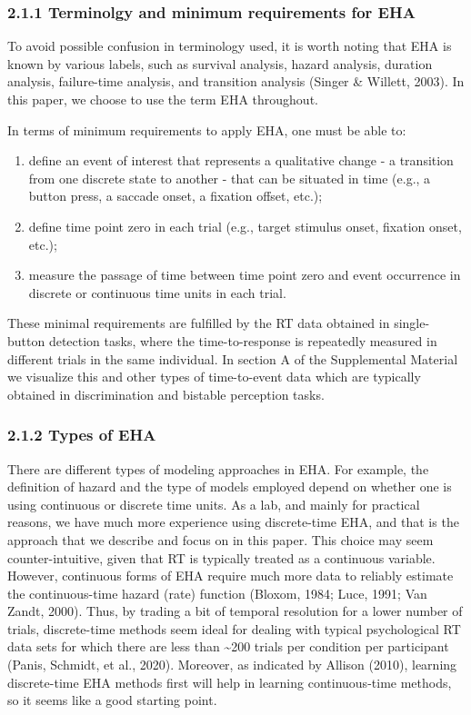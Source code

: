 \documentclass[
  man, donotrepeattitle,floatsintext]{apa6}
\begin{document}
\subsubsection{2.1.1 Terminolgy and minimum requirements for EHA}\label{terminolgy-and-minimum-requirements-for-eha}

To avoid possible confusion in terminology used, it is worth noting that EHA is known by various labels, such as survival analysis, hazard analysis, duration analysis, failure-time analysis, and transition analysis (Singer \& Willett, 2003). In this paper, we choose to use the term EHA throughout.

In terms of minimum requirements to apply EHA, one must be able to:

\begin{enumerate}
\def\labelenumi{\arabic{enumi}.}
\item
  define an event of interest that represents a qualitative change - a transition from one discrete state to another - that can be situated in time (e.g., a button press, a saccade onset, a fixation offset, etc.);
\item
  define time point zero in each trial (e.g., target stimulus onset, fixation onset, etc.);
\item
  measure the passage of time between time point zero and event occurrence in discrete or continuous time units in each trial.
\end{enumerate}

These minimal requirements are fulfilled by the RT data obtained in single-button detection tasks, where the time-to-response is repeatedly measured in different trials in the same individual. In section A of the Supplemental Material we visualize this and other types of time-to-event data which are typically obtained in discrimination and bistable perception tasks.

\subsubsection{2.1.2 Types of EHA}\label{types-of-eha}

There are different types of modeling approaches in EHA.
For example, the definition of hazard and the type of models employed depend on whether one is using continuous or discrete time units.
As a lab, and mainly for practical reasons, we have much more experience using discrete-time EHA, and that is the approach that we describe and focus on in this paper.
This choice may seem counter-intuitive, given that RT is typically treated as a continuous variable.
However, continuous forms of EHA require much more data to reliably estimate the continuous-time hazard (rate) function (Bloxom, 1984; Luce, 1991; Van Zandt, 2000).
Thus, by trading a bit of temporal resolution for a lower number of trials, discrete-time methods seem ideal for dealing with typical psychological RT data sets for which there are less than \textasciitilde200 trials per condition per participant (Panis, Schmidt, et al., 2020).
Moreover, as indicated by Allison (2010), learning discrete-time EHA methods first will help in learning continuous-time methods, so it seems like a good starting point.
\end{document}
